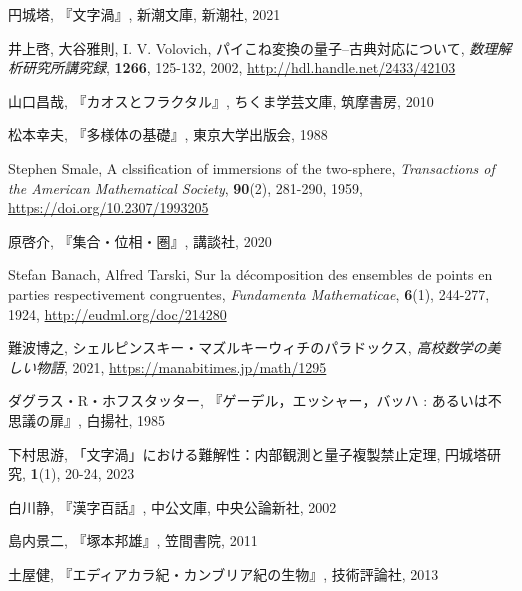 \documentclass[10pt, a5paper, twoside]{jsarticle}
\theoremstyle{definition}
\begin{document}
	\begin{thebibliography}{99}

		 円城塔, 『文字渦』, 新潮文庫, 新潮社, 2021

		 井上啓, 大谷雅則, I. V. Volovich, パイこね変換の量子--古典対応について, \textit{数理解析研究所講究録}, \textbf{1266}, 125-132, 2002, \url{http://hdl.handle.net/2433/42103}

		 山口昌哉, 『カオスとフラクタル』, ちくま学芸文庫, 筑摩書房, 2010

		 松本幸夫, 『多様体の基礎』, 東京大学出版会, 1988

		 Stephen Smale, A clssification of immersions of the two-sphere, \textit{Transactions of the American Mathematical Society}, \textbf{90}(2), 281-290, 1959, \url{https://doi.org/10.2307/1993205}

		 原啓介, 『集合・位相・圏』, 講談社, 2020

		 Stefan Banach, Alfred Tarski, Sur la décomposition des ensembles de points en parties respectivement congruentes, \textit{Fundamenta Mathematicae}, \textbf{6}(1), 244-277, 1924, \url{http://eudml.org/doc/214280}

		 難波博之, シェルピンスキー・マズルキーウィチのパラドックス, \textit{高校数学の美しい物語}, 2021, \url{https://manabitimes.jp/math/1295}

		 ダグラス・R・ホフスタッター, 『ゲーデル，エッシャー，バッハ : あるいは不思議の扉』, 白揚社, 1985

		 下村思游, 「文字渦」における難解性：内部観測と量子複製禁止定理, 円城塔研究, \textbf{1}(1), 20-24, 2023


		 白川静, 『漢字百話』, 中公文庫, 中央公論新社, 2002

		 島内景二, 『塚本邦雄』, 笠間書院, 2011

		 土屋健, 『エディアカラ紀・カンブリア紀の生物』, 技術評論社, 2013

	\end{thebibliography}
\end{document}
